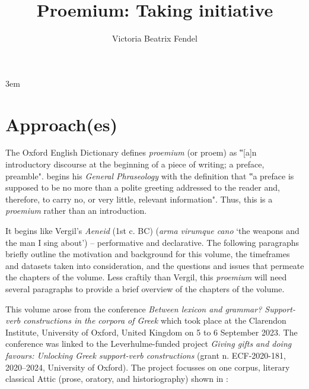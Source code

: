 \documentclass[output=paper,colorlinks,citecolor=brown]{langscibook}
\title{Proemium: Taking initiative}
\author{Victoria Beatrix Fendel\affiliation{University of Oxford, UK}}
\begin{document}
\emergencystretch 3em


\maketitle

\section{Approach(es)}
The Oxford English Dictionary defines \textit{proemium} (or proem) as 
‟[a]n introductory discourse at the beginning of a piece of writing; a preface, preamble". \citet[1]{melcukGeneralPhraseology2023} begins his \textit{General Phraseology} with the definition that ‟a preface is supposed to be no more than a polite greeting addressed to the reader and, therefore, to carry no, or very little, relevant information". Thus, this is a \textit{proemium} rather than an introduction. 


It begins like Vergil’s \textit{Aeneid} (1st c. BC) (\textit{arma virumque cano} ‘the weapons and the man I sing about’) – performative and declarative. The following paragraphs briefly outline the motivation and background for this volume, the timeframes and datasets taken into consideration, and the questions and issues that permeate the chapters of the volume. Less craftily than Vergil, this \textit{proemium} will need several paragraphs to provide a brief overview of the chapters of the volume. 


This volume arose from the conference \textit{Between lexicon and grammar? Support-verb constructions in the corpora of Greek} which took place at the Clarendon Institute, University of Oxford, United Kingdom on 5 to 6 September 2023. The conference was linked to the Leverhulme-funded project \textit{Giving gifts and doing favours: Unlocking Greek support-verb constructions} (grant n. ECF-2020-181, 2020–2024, University of Oxford). The project focusses on one corpus, literary classical Attic (prose, oratory, and historiography) shown in :
\end{document}

